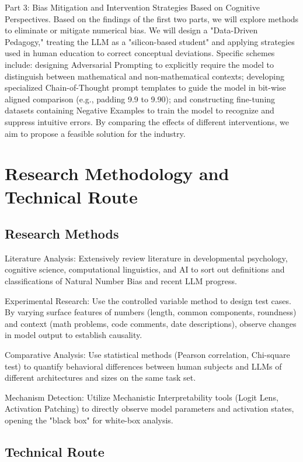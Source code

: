 Part 3: Bias Mitigation and Intervention Strategies Based on Cognitive Perspectives. Based on the findings of the first two parts, we will explore methods to eliminate or mitigate numerical bias. We will design a "Data-Driven Pedagogy," treating the LLM as a "silicon-based student" and applying strategies used in human education to correct conceptual deviations. Specific schemes include: designing Adversarial Prompting to explicitly require the model to distinguish between mathematical and non-mathematical contexts; developing specialized Chain-of-Thought prompt templates to guide the model in bit-wise aligned comparison (e.g., padding 9.9 to 9.90); and constructing fine-tuning datasets containing Negative Examples to train the model to recognize and suppress intuitive errors. By comparing the effects of different interventions, we aim to propose a feasible solution for the industry\cite{cobbe2021}.

\section{Research Methodology and Technical Route}

\subsection{Research Methods}

Literature Analysis: Extensively review literature in developmental psychology, cognitive science, computational linguistics, and AI to sort out definitions and classifications of Natural Number Bias and recent LLM progress.

Experimental Research: Use the controlled variable method to design test cases. By varying surface features of numbers (length, common components, roundness) and context (math problems, code comments, date descriptions), observe changes in model output to establish causality.

Comparative Analysis: Use statistical methods (Pearson correlation, Chi-square test) to quantify behavioral differences between human subjects and LLMs of different architectures and sizes on the same task set.

Mechanism Detection: Utilize Mechanistic Interpretability tools (Logit Lens, Activation Patching) to directly observe model parameters and activation states, opening the "black box" for white-box analysis.

\subsection{Technical Route}


